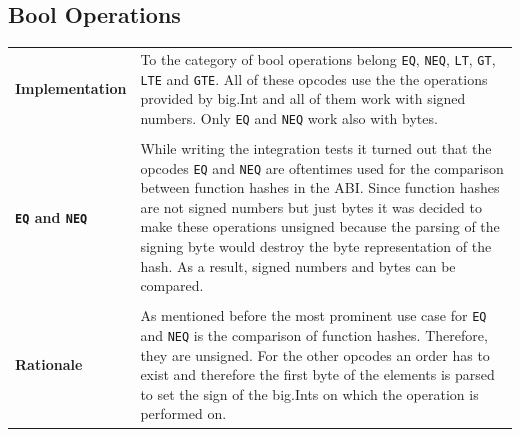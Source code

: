 \subsection{Bool Operations}
\begin{tabular}[t]{ p{3cm} p{12.5cm}}
\raggedright
\textbf{Implementation} &
To the category of bool operations belong \texttt{EQ}, \texttt{NEQ}, \texttt{LT}, \texttt{GT}, \texttt{LTE} and \texttt{GTE}. All of these opcodes use the the operations provided by big.Int and all of them work with signed numbers. Only \texttt{EQ} and \texttt{NEQ} work also with bytes. \\ \\
\raggedright
\textbf{\texttt{EQ} and \texttt{NEQ}} &
While writing the integration tests it turned out that the opcodes \texttt{EQ} and \texttt{NEQ} are oftentimes used for the comparison between function hashes in the ABI. Since function hashes are not signed numbers but just bytes it was decided to make these operations unsigned because the parsing of the signing byte would destroy the byte representation of the hash. As a result, signed numbers and bytes can be compared. \\ \\

\raggedright
\textbf{Rationale} &
As mentioned before the most prominent use case for \texttt{EQ} and \texttt{NEQ} is the comparison of function hashes. Therefore, they are unsigned. For the other opcodes an order has to exist and therefore the first byte of the elements is parsed to set the sign of the big.Ints on which the operation is performed on.
\end{tabular}


